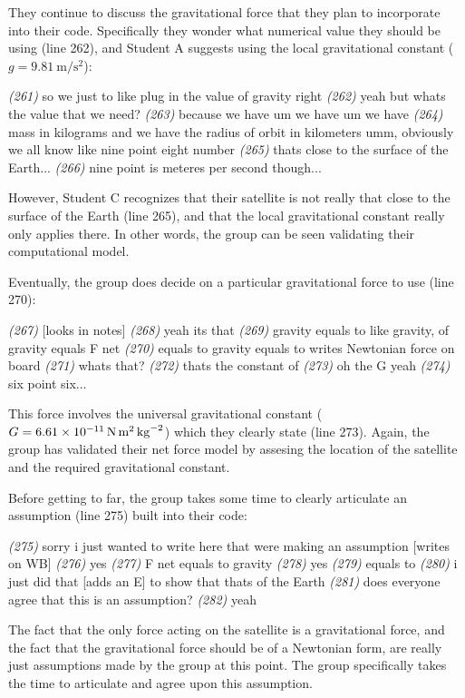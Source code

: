 \documentclass{msuphddissertation}
\begin{document}
\begin{doublespace}
They continue to discuss the gravitational force that they plan to incorporate into their code.  Specifically they wonder what numerical value they should be using (line 262), and Student A suggests using the local gravitational constant ($g=\SI{9.81}{\meter\per\second\squared}$):
\begin{description}
\SD \textit{(261)} so we just to like plug in the value of gravity right
\SA \textit{(262)} yeah but whats the value that we need?			
\SA \textit{(263)} because we have um we have um we have			
\SA \textit{(264)} mass in kilograms and we have {the radius of orbit in} kilometers umm, obviously we all know like nine point eight number			
\SC \textit{(265)} thats close to {the surface of the Earth}...	
\SA \textit{(266)} nine point is meteres per second though...\end{description}  However, Student C recognizes that their satellite is not really that close to the surface of the Earth (line 265), and that the local gravitational constant really only applies there.  In other words, the group can be seen validating their computational model.

Eventually, the group does decide on a particular gravitational force to use (line 270):
\begin{description}		
\SC \textit{(267)} [looks in notes]
\SD \textit{(268)} yeah its that
\SD \textit{(269)} gravity equals to like gravity, of gravity equals F net
\SD \textit{(270)} equals to gravity equals to {writes Newtonian force on board}
\SB	\textit{(271)} whats that?		
\SD \textit{(272)} thats the constant of
\SB	\textit{(273)} oh the G yeah		
\SB	\textit{(274)} six point six...\end{description}  This force involves the universal gravitational constant ($G=\SI{6.61E-11}{\newton\meter\squared\per\kilo\gram\squared}$) which they clearly state (line 273).  Again, the group has validated their net force model by assesing the location of the satellite and the required gravitational constant.

Before getting to far, the group takes some time to clearly articulate an assumption (line 275) built into their code:
\begin{description}
\SA \textit{(275)} sorry i just wanted to write here that were making an assumption [writes on WB]
\SD \textit{(276)} yes
\SD \textit{(277)} F net equals to gravity
\SD \textit{(278)} yes
\SD \textit{(279)} equals to
\SA \textit{(280)} i just did that [adds an E] to show that thats of the Earth			
\SA \textit{(281)} does everyone agree that this is an assumption?			
\SC \textit{(282)} yeah
\end{description}  The fact that the only force acting on the satellite is a gravitational force, and the fact that the gravitational force should be of a Newtonian form, are really just assumptions made by the group at this point.  The group specifically takes the time to articulate and agree upon this assumption.


\end{doublespace}
\end{document}
